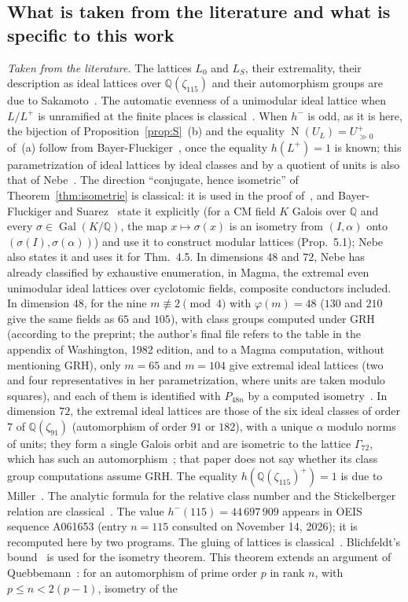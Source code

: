 \documentclass[11pt,a4paper]{amsart}
\theoremstyle{plain}
\theoremstyle{definition}
\numberwithin{equation}{section}
\newcommand{\Q}{\mathbb{Q}}
\DeclareMathOperator{\Nm}{N}
\DeclareMathOperator{\Gal}{Gal}
\newcommand{\Upp}{U^{+}_{\gg0}}
\newcommand{\Lz}{L_{0}}
\newcommand{\LS}{L_{S}}
\begin{document}
\subsection{What is taken from the literature and what is specific to this work}\label{subsec:connu}
\emph{Taken from the literature.} The lattices $\Lz$ and $\LS$, their extremality, their description as ideal lattices over $\Q(\zeta_{115})$ and their automorphism groups are due to Sakamoto~\cite{Sak26}. The automatic evenness of a unimodular ideal lattice when $L/L^+$ is unramified at the finite places is classical~\cite{Bay84,Bay99}. When $h^-$ is odd, as it is here, the bijection of Proposition~\ref{prop:S}~(b) and the equality $\Nm(U_L)=\Upp$ of~(a) follow from Bayer-Fluckiger~\cite[Prop.~3.1 and Lemma~3.2~a)]{Bay84}, once the equality $h(L^+)=1$ is known; this parametrization of ideal lattices by ideal classes and by a quotient of units is also that of Nebe~\cite[Rem.~4.4]{Neb16}. The direction ``conjugate, hence isometric'' of Theorem~\ref{thm:isometrie} is classical: it is used in the proof of~\cite[Cor.~3.3]{Bay84}, and Bayer-Fluckiger and Suarez~\cite[\S5, p.~409]{BFS05} state it explicitly (for a CM field $K$ Galois over $\Q$ and every $\sigma\in\Gal(K/\Q)$, the map $x\mapsto\sigma(x)$ is an isometry from $(I,\alpha)$ onto $(\sigma(I),\sigma(\alpha))$) and use it to construct modular lattices (Prop.~5.1); Nebe~\cite[Lemma~4.3~b)]{Neb16} also states it and uses it for Thm.~4.5. In dimensions $48$ and $72$, Nebe has already classified by exhaustive enumeration, in Magma, the extremal even unimodular ideal lattices over cyclotomic fields, composite conductors included. In dimension $48$, for the nine $m\not\equiv2\pmod4$ with $\varphi(m)=48$ ($130$ and $210$ give the same fields as $65$ and $105$), with class groups computed under GRH (according to the preprint; the author's final file refers to the table in the appendix of Washington, 1982 edition, and to a Magma computation, without mentioning GRH), only $m=65$ and $m=104$ give extremal ideal lattices (two and four representatives in her parametrization, where units are taken modulo squares), and each of them is identified with $P_{48n}$ by a computed isometry~\cite[Thm.~5.3 and its proof]{Neb13}. In dimension $72$, the extremal ideal lattices are those of the six ideal classes of order $7$ of $\Q(\zeta_{91})$ (automorphism of order $91$ or $182$), with a unique $\alpha$ modulo norms of units; they form a single Galois orbit and are isometric to the lattice $\Gamma_{72}$, which has such an automorphism~\cite[Thm.~4.5 and its proof]{Neb16}; that paper does not say whether its class group computations assume GRH. The equality $h(\Q(\zeta_{115})^+)=1$ is due to Miller~\cite{Mil14}. The analytic formula for the relative class number and the Stickelberger relation are classical~\cite{Was97}. The value $h^-(115)=44\,697\,909$ appears in OEIS sequence A061653 (entry $n=115$ consulted on November 14, 2026); it is recomputed here by two programs. The gluing of lattices is classical~\cite[Ch.~4]{SPLAG}. Blichfeldt's bound~\cite{Bli29} is used for the isometry theorem. This theorem extends an argument of Quebbemann~\cite[\S3]{Que81}: for an automorphism of prime order $p$ in rank $n$, with $p\le n<2(p-1)$, isometry of the 
\end{document}
